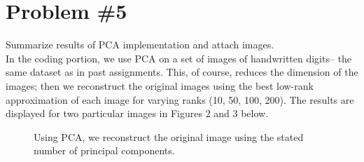 \documentclass[12pt]{article}
\begin{document}
	\section*{Problem \#5}
	Summarize results of PCA implementation and attach images. \\
	In the coding portion, we use PCA on a set of images of handwritten digits-- the same dataset as in past assignments. This, of course, reduces the dimension of the images; then we reconstruct the original images using the best low-rank approximation of each image for varying ranks (10, 50, 100, 200). The results are displayed for two particular images in Figures 2 and 3 below.
	\begin{figure}[H]
		\centering
	\end{figure}
	\begin{figure}[H]
		\centering
		\caption{Using PCA, we reconstruct the original image using the stated number of principal components.}
	\end{figure}
\end{document}
